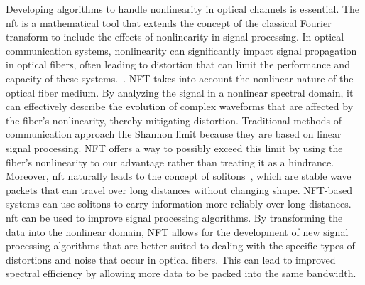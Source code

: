 Developing algorithms to handle nonlinearity in optical channels is essential. The \gls{nft} is a mathematical tool that extends the concept of the classical Fourier transform to include the effects of nonlinearity in signal processing. In optical communication systems, nonlinearity can significantly impact signal propagation in optical fibers, often leading to distortion that can limit the performance and capacity of these systems.~\cite{Turitsyn:17}.
NFT takes into account the nonlinear nature of the optical fiber medium. By analyzing the signal in a nonlinear spectral domain, it can effectively describe the evolution of complex waveforms that are affected by the fiber's nonlinearity, thereby mitigating distortion.
Traditional methods of communication approach the Shannon limit because they are based on linear signal processing. NFT offers a way to possibly exceed this limit by using the fiber's nonlinearity to our advantage rather than treating it as a hindrance. Moreover, \gls{nft} naturally leads to the concept of solitons~\cite{hasegawa1973}, which are stable wave packets that can travel over long distances without changing shape. NFT-based systems can use solitons to carry information more reliably over long distances. \gls{nft} can be used to improve signal processing algorithms. By transforming the data into the nonlinear domain, NFT allows for the development of new signal processing algorithms that are better suited to dealing with the specific types of distortions and noise that occur in optical fibers. This can lead to improved spectral efficiency by allowing more data to be packed into the same bandwidth. 







